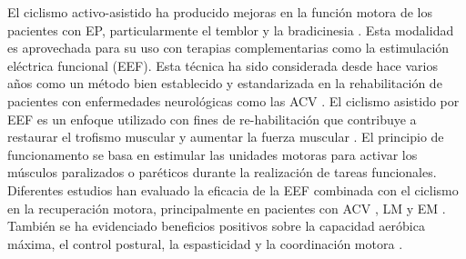 \vspace{5pt}
El ciclismo activo-asistido ha producido mejoras en la función motora de los pacientes
con EP, particularmente el temblor y la bradicinesia \cite{ryan2020interval, palomino2021efectividad}. 
Esta modalidad es
aprovechada para su uso con terapias complementarias como la estimulación eléctrica
funcional (EEF). Esta técnica ha sido considerada desde hace varios años como un
método bien establecido y estandarizada en la rehabilitación de pacientes con
enfermedades neurológicas como las ACV \cite{rabelo2018overview}. El ciclismo asistido por EEF es un
enfoque utilizado con fines de re-habilitación que contribuye a restaurar el trofismo
muscular y aumentar la fuerza muscular \cite{barbosa2015application, ferrante2008cycling}. El principio de funcionamento se basa
en estimular las unidades motoras para activar los músculos paralizados o paréticos
durante la realización de tareas funcionales. Diferentes estudios han evaluado la eficacia
de la EEF combinada con el ciclismo en la recuperación motora, principalmente en
pacientes con ACV \cite{ambrosini2020does}, LM \cite{casabona2020effects} y EM \cite{pilutti2019functional}. También se ha evidenciado beneficios
positivos sobre la capacidad aeróbica máxima, el control postural, la espasticidad y la
coordinación motora \cite{barbosa2015application, rabelo2018overview}.